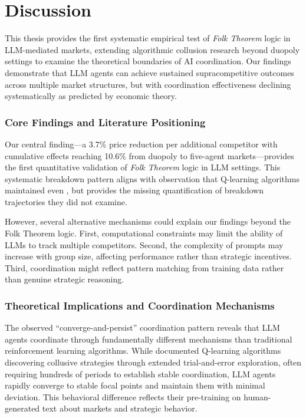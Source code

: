\section{Discussion}\label{sec:dis}

This thesis provides the first systematic empirical test of \emph{Folk Theorem} logic in LLM-mediated markets, extending algorithmic collusion research beyond duopoly settings to examine the theoretical boundaries of AI coordination. Our findings demonstrate that LLM agents can achieve sustained supracompetitive outcomes across multiple market structures, but with coordination effectiveness declining systematically as predicted by economic theory.

\subsubsection*{Core Findings and Literature Positioning}

Our central finding—a 3.7\% price reduction per additional competitor with cumulative effects reaching 10.6\% from duopoly to five-agent markets—provides the first quantitative validation of \emph{Folk Theorem} logic in LLM settings. This systematic breakdown pattern aligns with \textcite[p. 3268]{calvano_artificial_2020} observation that Q-learning algorithms maintained  even , but provides the missing quantification of breakdown trajectories they did not examine.

However, several alternative mechanisms could explain our findings beyond the Folk Theorem logic. First, computational constraints may limit the ability of LLMs to track multiple competitors. Second, the complexity of prompts may increase with group size, affecting performance rather than strategic incentives. Third, coordination might reflect pattern matching from training data rather than genuine strategic reasoning.

\subsubsection*{Theoretical Implications and Coordination Mechanisms}

The observed \enquote{converge-and-persist} coordination pattern reveals that LLM agents coordinate through fundamentally different mechanisms than traditional reinforcement learning algorithms. While \textcite{calvano_artificial_2020,calvano_algorithmic_2021} documented Q-learning algorithms discovering collusive strategies through extended trial-and-error exploration, often requiring hundreds of periods to establish stable coordination, LLM agents rapidly converge to stable focal points and maintain them with minimal deviation. This behavioral difference reflects their pre-training on human-generated text about markets and strategic behavior.

